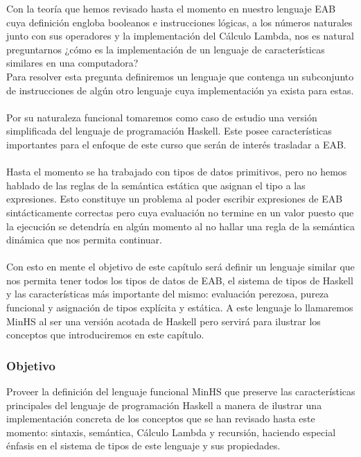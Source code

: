 Con la teoría que hemos revisado hasta el momento en nuestro lenguaje \textsf{EAB} cuya definición engloba booleanos e instrucciones lógicas, a los números naturales junto con sus operadores y la implementación del Cálculo Lambda, nos es natural preguntarnos  ¿cómo es la implementación de un lenguaje de características similares en una computadora? \\ Para resolver esta pregunta definiremos un lenguaje que contenga un subconjunto de instrucciones de algún otro lenguaje cuya implementación ya exista para estas.  \\\\
Por su naturaleza funcional tomaremos como caso de estudio una versión simplificada del lenguaje de programación \textsf{Haskell}. Este posee características importantes para el enfoque de este curso que serán de interés trasladar a \textsf{EAB}. \\\\
Hasta el momento se ha trabajado con tipos de datos primitivos, pero no hemos hablado de las reglas de la semántica estática que asignan el tipo a las expresiones. Esto constituye un problema al poder escribir expresiones de \textsf{EAB} sintácticamente correctas pero cuya evaluación no termine en un valor puesto que la ejecución se detendría en algún momento al no hallar una regla de la semántica dinámica que nos permita continuar. \\\\
Con esto en mente el objetivo de este capítulo será definir un lenguaje similar que nos permita tener todos los tipos de datos de \textsf{EAB}, el sistema de tipos de \textsf{Haskell} y las características más importante del mismo: evaluación perezosa, pureza funcional y asignación de tipos explícita y estática. 
A este lenguaje lo llamaremos \textsf{MinHS} al ser una versión acotada de \textsf{Haskell} pero servirá para ilustrar los conceptos que introduciremos en este capítulo.

\subsubsection{Objetivo}
Proveer la definición del lenguaje funcional \textsf{MinHS} que preserve las características principales del lenguaje de programación \textsf{Haskell} a manera de ilustrar una implementación concreta de los conceptos que se han revisado hasta este momento: sintaxis, semántica, Cálculo Lambda y recursión, haciendo especial énfasis en el sistema de tipos de este lenguaje y sus propiedades.


